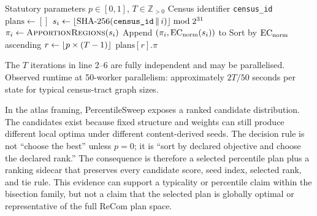 \begin{algorithm}
\caption{\ps{}$(p, T)$}
\label{alg:percentile-sweep}
\begin{algorithmic}[1]
\Require Statutory parameters $p \in [0,1]$, $T \in \mathbb{Z}_{>0}$
\Require Census identifier \texttt{census\_id}
\State $\text{plans} \leftarrow []$
  \State $s_i \leftarrow \lfloor \text{SHA-256}(\texttt{census\_id} \,\|\, i) \rfloor \bmod 2^{31}$
  \State $\pi_i \leftarrow \textsc{ApportionRegions}{}(s_i)$  
  \State Append $(\pi_i, \mathrm{EC}_{\mathrm{norm}}(s_i))$ to 
\EndFor
\State Sort  by $\mathrm{EC}_{\mathrm{norm}}$ ascending 
\State $r \leftarrow \lfloor p \times (T - 1) \rfloor$
\State \Return $\text{plans}[r].\pi$
\end{algorithmic}
\end{algorithm}

The $T$ iterations in line 2--6 are fully independent and may be
parallelised.
Observed runtime at 50-worker parallelism: approximately $2T/50$
seconds per state for typical census-tract graph sizes.

In the atlas framing, PercentileSweep exposes a ranked candidate distribution.
The candidates exist because fixed structure and weights can still produce
different local optima under different content-derived seeds.
The decision rule is not ``choose the best'' unless $p=0$; it is ``sort by
declared objective and choose the declared rank.''
The consequence is therefore a selected percentile plan plus a ranking sidecar
that preserves every candidate score, seed index, selected rank, and tie rule.
This evidence can support a typicality or percentile claim within the bisection
family, but not a claim that the selected plan is globally optimal or
representative of the full ReCom plan space.
